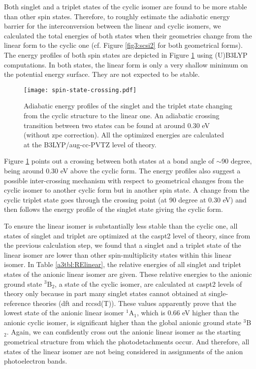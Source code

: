 \begin{refsection}
Both singlet and a triplet states of the cyclic isomer are found to be more stable than other spin states. Therefore, to roughly estimate the adiabatic energy barrier for the interconversion between the linear and cyclic isomers, we calculated the total energies of both states when their geometries change from the linear form to the cyclic one (cf. Figure \ref{fig3:scsi2} for both geometrical forms). The energy profiles of both spin states are depicted in Figure \ref{a3fig:crossing} using (U)B3LYP computations. In both states, the linear form is only a very shallow minimum on the potential energy surface. They are not expected to be stable.



\begin{figure}[htb!]
	\centering
	\texttt{[image: spin-state-crossing.pdf]}
	\caption{Adiabatic energy profiles of the singlet and the triplet state changing from the cyclic structure to the linear one. An adiabatic crossing transition between two states can be found at around 0.30 eV (without \acrshort{zpe} correction). All the optimized energies are calculated at the B3LYP/aug-cc-PVTZ level of theory.}
	\label{a3fig:crossing}
\end{figure}





Figure \ref{a3fig:crossing} points out a crossing between both states at a bond angle of $\sim$90 degree, being around 0.30 eV above the cyclic form. The energy profiles also suggest a possible inter-crossing mechanism with respect to geometrical changes from the cyclic isomer to another cyclic form but in another spin state. A change from the cyclic triplet state goes through the crossing point (at 90 degree at 0.30 eV) and then follows the energy profile of the singlet state giving the cyclic form.




To ensure the linear isomer is substantially less stable than the cyclic one, all states of singlet and triplet are optimized at the \acrshort{caspt2} level of theory, since from the previous calculation step, we found that a singlet and a triplet state of the linear isomer are lower than other spin-multiplicity states within this linear isomer. In Table \ref{a3tbl:RElinear}, the relative energies of all singlet and triplet states of the anionic linear isomer are given. These relative energies to the anionic ground state $^3$B$_2$, a state of the cyclic isomer, are calculated at \acrshort{caspt2} levels of theory only because in part many singlet states cannot obtained at single-reference theories (\acrshort{dft} and \acrshort{rccsd}(T)). These values apparently prove that the lowest state of the anionic linear isomer $^1$A$_1$, which is 0.66 eV higher than the anionic cyclic isomer, is significant higher than the global anionic ground state $^3$B$_2$. Again, we can confidently cross out the anionic linear isomer as the starting geometrical structure from which the photodetachments occur. And therefore, all states of the linear isomer are not being considered in assignments of the anion photoelectron bands.





\end{refsection}
